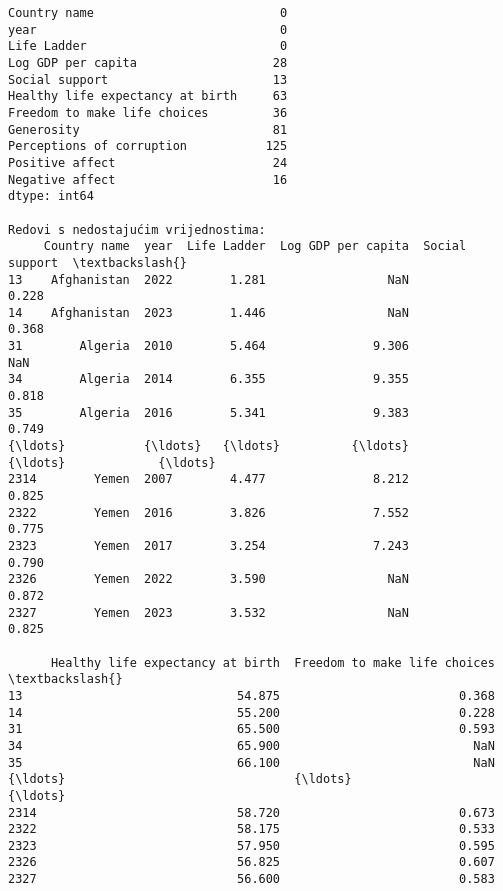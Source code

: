 \documentclass[11pt]{article}
\begin{document}
    \begin{Verbatim}[commandchars=\\\{\}]
Country name                          0
year                                  0
Life Ladder                           0
Log GDP per capita                   28
Social support                       13
Healthy life expectancy at birth     63
Freedom to make life choices         36
Generosity                           81
Perceptions of corruption           125
Positive affect                      24
Negative affect                      16
dtype: int64

Redovi s nedostajućim vrijednostima:
     Country name  year  Life Ladder  Log GDP per capita  Social support  \textbackslash{}
13    Afghanistan  2022        1.281                 NaN           0.228
14    Afghanistan  2023        1.446                 NaN           0.368
31        Algeria  2010        5.464               9.306             NaN
34        Algeria  2014        6.355               9.355           0.818
35        Algeria  2016        5.341               9.383           0.749
{\ldots}           {\ldots}   {\ldots}          {\ldots}                 {\ldots}             {\ldots}
2314        Yemen  2007        4.477               8.212           0.825
2322        Yemen  2016        3.826               7.552           0.775
2323        Yemen  2017        3.254               7.243           0.790
2326        Yemen  2022        3.590                 NaN           0.872
2327        Yemen  2023        3.532                 NaN           0.825

      Healthy life expectancy at birth  Freedom to make life choices  \textbackslash{}
13                              54.875                         0.368
14                              55.200                         0.228
31                              65.500                         0.593
34                              65.900                           NaN
35                              66.100                           NaN
{\ldots}                                {\ldots}                           {\ldots}
2314                            58.720                         0.673
2322                            58.175                         0.533
2323                            57.950                         0.595
2326                            56.825                         0.607
2327                            56.600                         0.583


\end{Verbatim}
\end{document}
